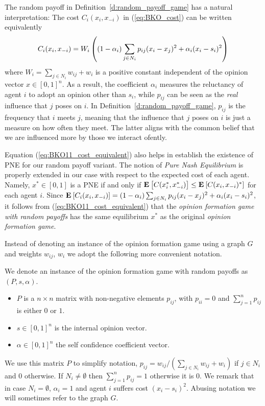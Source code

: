The random payoff in Definition~\ref{d:random_payoff_game} has a natural 
interpretation: The cost $C_i(x_i,x_{-i})$ in (\ref{eq:BKO_cost})
can be written equivalently
\begin{equation}\label{eq:BKO11_cost_equivalent}
C_i(x_i,x_{-i}) = W_i\left( (1-\alpha_i)\sum_{j \in N_i} p_{ij}(x_i-x_j)^2  + \alpha_i(x_i-s_i)^2\right)
\end{equation}
where $W_i=\sum_{j\in N_i}w_{ij} + w_i$ is a positive constant independent
of the opinion vector $x\in [0,1]^n$. As a result, the coefficient $\alpha_i$
measures the reluctancy of agent $i$ to adopt an opinion other than $s_i$, while 
$p_{ij}$ can be seen as the \emph{real} influence that $j$ poses on $i$.
In Definition~\ref{d:random_payoff_game}, $p_{ij}$ is the frequency that 
$i$ meets $j$, meaning that the influence that $j$ poses on $i$ is just a measure
on how often they meet. The latter aligns with the common belief 
that we are influenced more by those we interact ofently.

Equation (\ref{eq:BKO11_cost_equivalent}) also helps in establish the existence of PNE for 
our random payoff variant. The notion of \emph{Pure Nash Equilibrium} is properly
 extended in our case with respect to the expected cost of each agent. Namely, 
$x^* \in [0,1]$ is a PNE if and only if $\Exp{C(x_i^*, x_{-i}^*)} \leq \Exp{C(x_i, x_{-i})^*}$ 
for each agent $i$. Since $\bm{\mathrm{E}}_{} \left[ C_i(x_i,x_{-i}) \right]=(1-\alpha_i)\sum_{j \in N_i}p_{ij}(x_i-x_j)^2 + \alpha_i(x_i-s_i)^2$, 
it follows from (\ref{eq:BKO11_cost_equivalent}) that the 
\emph{opinion formation game with random payoffs} has the same equilibrium $x^*$ as 
the original \emph{opinion formation game}.

Instead of denoting an instance of the opinion formation game using a graph $G$
and weights $w_{ij}$, $w_i$ we adopt the following more convenient notation.

\begin{definition}\label{d:random_payof_game_instance}
We denote an instance of the opinion formation game with random payoffs as $(P,s,\alpha)$.
\begin{itemize}
 \item $P$ is a $n \times n$  matrix with non-negative elements $p_{ij}$,
  with $p_{ii}=0$ and $\sum_{j=1}^n p_{ij}$ is either $0$ or $1$.
 \item $s \in [0,1]^n$ is the internal opinion vector.
 \item $\alpha \in [0,1]^n$ the self confidence coefficient vector.
 \end{itemize}
\end{definition}
We use this matrix $P$ to simplify notation, $p_{ij} = w_{ij}/(\sum_{j \in N_i}w_{ij}+w_i)$ if $j \in N_i$ and $0$ otherwise.
If $N_i \neq \emptyset$ then $\sum_{j=1}^n p_{ij}=1$ otherwise it is $0$. We remark that in case $N_i=\emptyset$, $\alpha_i=1$
and agent $i$ suffers cost $(x_i-s_i)^2$.
Abusing notation we will sometimes refer to the graph $G$.


